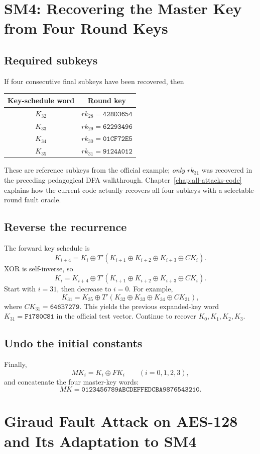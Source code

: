 \documentclass[11pt,a4paper]{report}
\newcommand{\hex}[1]{\texttt{#1}}
\newcommand{\xor}{\mathbin{\oplus}}
\begin{document}
\chapter{SM4: Recovering the Master Key from Four Round Keys}
\section{Required subkeys}
If four consecutive final subkeys have been recovered, then
\begin{center}\begin{tabular}{cc}\toprule Key-schedule word&Round key\\\midrule\(K_{32}\)&\(rk_{28}=\hex{428D3654}\)\\\(K_{33}\)&\(rk_{29}=\hex{62293496}\)\\\(K_{34}\)&\(rk_{30}=\hex{01CF72E5}\)\\\(K_{35}\)&\(rk_{31}=\hex{9124A012}\)\\\bottomrule\end{tabular}\end{center}
These are reference subkeys from the official example; \emph{only} \(rk_{31}\) was recovered in the preceding pedagogical DFA walkthrough. Chapter~\ref{chap:all-attacks-code} explains how the current code actually recovers all four subkeys with a selectable-round fault oracle.
\section{Reverse the recurrence}
The forward key schedule is
\[K_{i+4}=K_i\xor T'(K_{i+1}\xor K_{i+2}\xor K_{i+3}\xor CK_i).\]
XOR is self-inverse, so
\[\boxed{K_i=K_{i+4}\xor T'(K_{i+1}\xor K_{i+2}\xor K_{i+3}\xor CK_i)}.\]
Start with \(i=31\), then decrease to \(i=0\). For example,
\[K_{31}=K_{35}\xor T'(K_{32}\xor K_{33}\xor K_{34}\xor CK_{31}),\]
where \(CK_{31}=\hex{646B7279}\). This yields the previous expanded-key word \(K_{31}=\hex{F1780C81}\) in the official test vector. Continue to recover \(K_0,K_1,K_2,K_3\).
\section{Undo the initial constants}
Finally,
\[MK_i=K_i\xor FK_i\qquad(i=0,1,2,3),\]
and concatenate the four master-key words:
\[\boxed{MK=\hex{0123456789ABCDEFFEDCBA9876543210}}.\]

\chapter{Giraud Fault Attack on AES-128 and Its Adaptation to SM4}
\label{chap:giraud}
\end{document}
